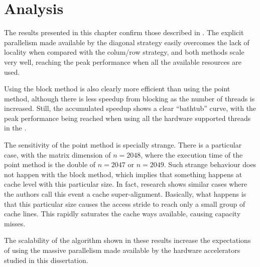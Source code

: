 \documentclass[../thesis]{subfiles}
\begin{document}
	\section{Analysis}
	\label{sec:multicore:analysis}

	The results presented in this chapter confirm those described in \cite{Deadman:Higham:Ralha:2013}. The explicit parallelism made available by the diagonal strategy easily overcomes the lack of locality when compared with the colum/row strategy, and both methods scale very well, reaching the peak performance when all the available resources are used.

	Using the block method is also clearly more efficient than using the point method, although there is less speedup from blocking as the number of threads is increased. Still, the accumulated speedup shows a clear ``bathtub'' curve, with the peak performance being reached when using all the hardware supported threads in the \cpu.

	The sensitivity of the point method is specially strange. There is a particular case, with the matrix dimension of $n = 2048$, where the execution time of the point method is the double of $n = 2047$ or $n = 2049$. Such strange behaviour does not happen with the block method, which implies that something happens at cache level with this particular size. In fact, research shows similar cases where the authors call this event a cache super-alignment. Basically, what happens is that this particular size causes the access stride to reach only a small group of cache lines. This rapidly saturates the cache ways available, causing capacity misses.

	The scalability of the algorithm shown in these results increase the expectations of using the massive parallelism made available by the hardware accelerators studied in this dissertation.
\end{document}
